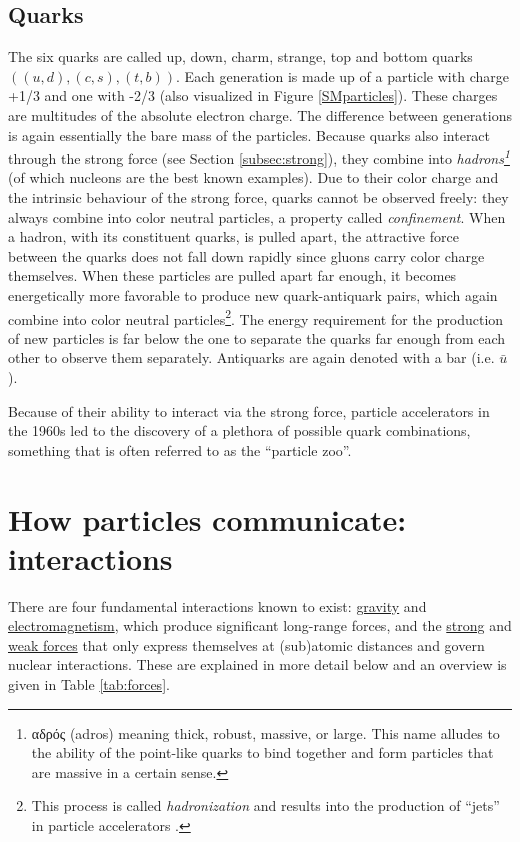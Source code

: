 \subsection{Quarks}
\label{sub:quarks}
The six quarks are called up, down, charm, strange, top and bottom quarks $((u,d),(c,s),(t,b))$.
Each generation is made up of a particle with charge +1/3 and one with -2/3 (also visualized in Figure \ref{SMparticles}). These charges are multitudes of the absolute electron charge.
The difference between generations is again essentially the bare mass of the particles. Because quarks also interact through the strong force (see Section \ref{subsec:strong}), they combine into 
\textit{hadrons\footnote{\gr αδρός \en (adros) meaning thick, robust, massive, or large. This name alludes to the ability of the point-like quarks to bind together and form particles that are massive in a certain sense.}} (of which nucleons are the best known examples). Due to their color charge and the intrinsic behaviour of the strong force, quarks cannot be observed freely: they always combine into color neutral particles, a property called \textit{confinement}. When a hadron, with its constituent quarks, is pulled apart, the attractive force between the quarks does not fall down rapidly since gluons carry color charge themselves. When these particles are pulled apart far enough, it becomes energetically more favorable to produce new quark-antiquark pairs, which again combine into color neutral particles\footnote{This process is called \textit{hadronization} and results into the production of ``jets'' in particle accelerators \cite{cmsjetsurl}.}. The energy requirement for the production of new particles is far below the one to separate the quarks far enough from each other to observe them separately. Antiquarks are again denoted with a bar (i.e. $\bar{u}$).

Because of their ability to interact via the strong force, particle accelerators in the 1960s led to the discovery of a plethora of possible quark combinations, something that is often referred to as the ``particle zoo''.



\section{How particles communicate: interactions}

There are four fundamental interactions known to exist: \underline{gravity} and \underline{electromagnetism}, which produce significant long-range forces, and the \underline{strong} and \underline{weak forces} that only express themselves at (sub)atomic distances and govern nuclear interactions. These are explained in more detail below and an overview is given in Table \ref{tab:forces}.

